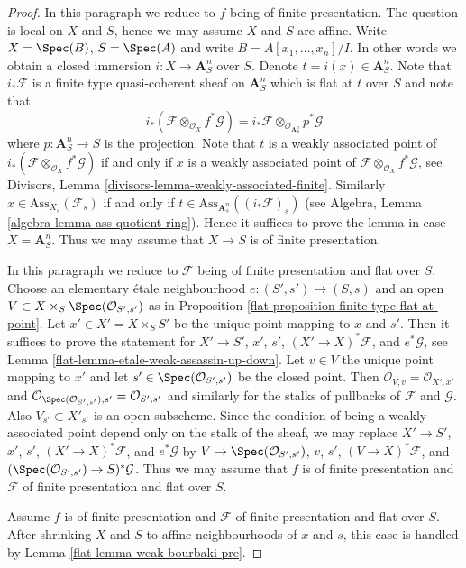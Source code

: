 \begin{proof}

In this paragraph we reduce to $f$ being of finite presentation.
The question is local on $X$ and $S$, hence we may assume $X$ and $S$
are affine. Write $X = \Spec(B)$, $S = \Spec(A)$ and write
$B = A[x_1, \ldots, x_n]/I$. In other words we obtain a closed immersion
$i : X \to \mathbf{A}^n_S$ over $S$. Denote $t = i(x) \in \mathbf{A}^n_S$.
Note that $i_*\mathcal{F}$ is a finite type quasi-coherent sheaf on
$\mathbf{A}^n_S$ which is flat at $t$ over $S$ and note that
$$
i_*(\mathcal{F} \otimes_{\mathcal{O}_X} f^*\mathcal{G}) =
i_*\mathcal{F} \otimes_{\mathcal{O}_{\mathbf{A}^n_S}} p^*\mathcal{G}
$$
where $p : \mathbf{A}^n_S \to S$ is the projection. Note that
$t$ is a weakly associated point of
$i_*(\mathcal{F} \otimes_{\mathcal{O}_X} f^*\mathcal{G})$
if and only if $x$ is a weakly associated point of
$\mathcal{F} \otimes_{\mathcal{O}_X} f^*\mathcal{G}$, see
Divisors, Lemma \ref{divisors-lemma-weakly-associated-finite}.
Similarly $x \in \text{Ass}_{X_s}(\mathcal{F}_s)$ if and only
if $t \in \text{Ass}_{\mathbf{A}^n_s}((i_*\mathcal{F})_s)$ (see
Algebra, Lemma \ref{algebra-lemma-ass-quotient-ring}).
Hence it suffices to prove the lemma in case $X = \mathbf{A}^n_S$.
Thus we may assume that $X \to S$ is of finite presentation.

\medskip\noindent
In this paragraph we reduce to $\mathcal{F}$ being of finite presentation
and flat over $S$.
Choose an elementary \'etale neighbourhood $e : (S', s') \to (S, s)$
and an open $V \subset X \times_S \Spec(\mathcal{O}_{S', s'})$
as in Proposition \ref{flat-proposition-finite-type-flat-at-point}.
Let $x' \in X' = X \times_S S'$ be the unique point mapping to $x$
and $s'$. Then it suffices to prove the statement for
$X' \to S'$, $x'$, $s'$, $(X' \to X)^*\mathcal{F}$, and $e^*\mathcal{G}$, see
Lemma \ref{flat-lemma-etale-weak-assassin-up-down}.
Let $v \in V$ the unique point mapping to $x'$
and let $s' \in \Spec(\mathcal{O}_{S', s'})$ be the closed point.
Then $\mathcal{O}_{V, v} = \mathcal{O}_{X', x'}$
and $\mathcal{O}_{\Spec(\mathcal{O}_{S', s'}), s'} =
\mathcal{O}_{S', s'}$ and similarly for the stalks of pullbacks of
$\mathcal{F}$ and $\mathcal{G}$.
Also $V_{s'} \subset X'_{s'}$ is an open subscheme.
Since the condition of being a weakly associated point
depend only on the stalk of the sheaf, we may
replace
$X' \to S'$, $x'$, $s'$, $(X' \to X)^*\mathcal{F}$, and $e^*\mathcal{G}$
by
$V \to \Spec(\mathcal{O}_{S', s'})$, $v$, $s'$, $(V \to X)^*\mathcal{F}$,
and $(\Spec(\mathcal{O}_{S', s'}) \to S)^*\mathcal{G}$.
Thus we may assume that $f$ is of finite presentation and
$\mathcal{F}$ of finite presentation and flat over $S$.

\medskip\noindent
Assume $f$ is of finite presentation and
$\mathcal{F}$ of finite presentation and flat over $S$.
After shrinking $X$ and $S$ to affine neighbourhoods
of $x$ and $s$, this case is handled by
Lemma \ref{flat-lemma-weak-bourbaki-pre}.
\end{proof}


